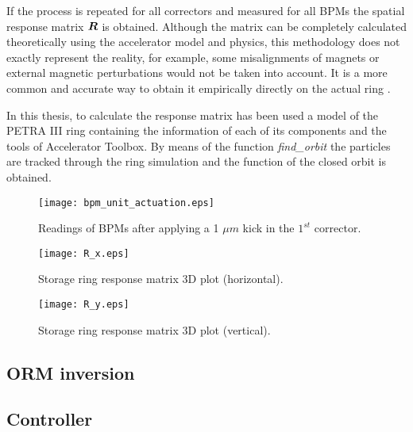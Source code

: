 If the process is repeated for all correctors and measured for all BPMs the spatial response matrix $\bm{R}$ is obtained. Although the matrix can be completely calculated theoretically using the accelerator model and physics, this methodology does not exactly represent the reality, for example, some misalignments of magnets or external magnetic perturbations would not be taken into account. It is a more common and accurate way to obtain it empirically directly on the actual ring \cite{klute2011petra}. 

In this thesis, to calculate the response matrix has been used a model of the PETRA III ring containing the information of each of its components and the tools of Accelerator Toolbox. By means of the function \textit{find\_orbit} \cite{Welcomet22:online} the particles are tracked through the ring simulation and the function of the closed orbit is obtained.

\begin{figure}
    \begin{center}
        \texttt{[image: bpm\_unit\_actuation.eps]}
    \end{center}
    \caption{Readings of BPMs after applying a 1 $\mu m$ kick in the $\textrm{1}^{st}$ corrector.}
    \label{fig:bpm_unit_actuation}
\end{figure}

\begin{figure}
    \begin{center}
        \texttt{[image: R\_x.eps]}
    \end{center}
    \caption{Storage ring response matrix 3D plot (horizontal).}
    \label{fig:R_x}
\end{figure}

\begin{figure}
    \begin{center}
        \texttt{[image: R\_y.eps]}
    \end{center}
    \caption{Storage ring response matrix 3D plot (vertical).}
    \label{fig:R_y}
\end{figure}

\subsection{ORM inversion}

\subsection{Controller}

